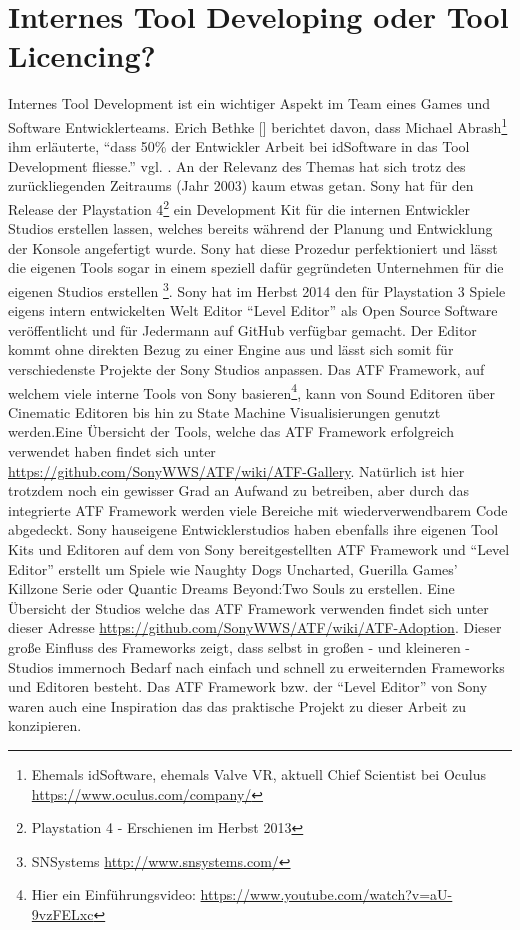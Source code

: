 \documentclass[pagesize, paper=a4, fontsize=12pt, titlepage=true, headings=small, headnosepline, abstractoff, liststotoc, nochapterprefix, plainheadsepline, twoside]{scrreprt}
\begin{document}
\section{Internes Tool Developing oder Tool Licencing?}
Internes Tool Development ist ein wichtiger Aspekt im Team eines Games und Software Entwicklerteams. Erich Bethke [] berichtet davon, dass Michael Abrash\footnote{Ehemals idSoftware, ehemals Valve VR, aktuell Chief Scientist bei Oculus \url{https://www.oculus.com/company/}} ihm erläuterte, “dass 50\% der Entwickler Arbeit bei idSoftware in das Tool Development fliesse.” vgl. \cite[S. 44]{Bethke2003}. An der Relevanz des Themas hat sich trotz des zurückliegenden Zeitraums (Jahr 2003) kaum etwas getan. Sony hat für den Release der Playstation 4\footnote{Playstation 4 - Erschienen im Herbst 2013} ein Development Kit  für die internen Entwickler Studios  erstellen lassen, welches bereits während der Planung und Entwicklung der Konsole angefertigt wurde. Sony hat diese Prozedur perfektioniert und lässt die eigenen Tools sogar in einem speziell dafür gegründeten Unternehmen für die eigenen Studios erstellen \footnote{SNSystems \url{http://www.snsystems.com/}}. Sony hat im Herbst 2014 den für Playstation 3 Spiele eigens intern entwickelten Welt Editor “Level Editor” als Open Source Software veröffentlicht und für Jedermann auf GitHub verfügbar gemacht. Der Editor kommt ohne direkten Bezug zu einer Engine aus und lässt sich somit für verschiedenste Projekte der Sony Studios anpassen. Das ATF Framework, auf welchem viele interne Tools von Sony basieren\footnote{Hier ein Einführungsvideo: \url{https://www.youtube.com/watch?v=aU-9vzFELxc}}, kann von Sound Editoren über Cinematic Editoren bis hin zu State Machine Visualisierungen genutzt werden.Eine Übersicht der Tools, welche das ATF Framework erfolgreich verwendet haben findet sich unter \url{https://github.com/SonyWWS/ATF/wiki/ATF-Gallery}. Natürlich ist hier trotzdem noch ein gewisser Grad an Aufwand zu betreiben, aber durch das integrierte ATF Framework werden viele Bereiche mit wiederverwendbarem Code abgedeckt. Sony hauseigene Entwicklerstudios haben ebenfalls ihre eigenen Tool Kits und Editoren auf dem von Sony bereitgestellten ATF Framework und “Level Editor” erstellt um Spiele wie Naughty Dogs Uncharted, Guerilla Games’ Killzone Serie oder Quantic Dreams Beyond:Two Souls zu erstellen. Eine Übersicht der Studios welche das ATF Framework verwenden findet sich unter dieser Adresse \url{https://github.com/SonyWWS/ATF/wiki/ATF-Adoption}. Dieser große Einfluss des Frameworks zeigt, dass selbst in großen - und kleineren - Studios immernoch Bedarf nach einfach und schnell zu erweiternden Frameworks und Editoren besteht. Das ATF Framework bzw. der “Level Editor” von Sony waren auch eine Inspiration das das praktische Projekt zu dieser Arbeit zu konzipieren.
\end{document}

